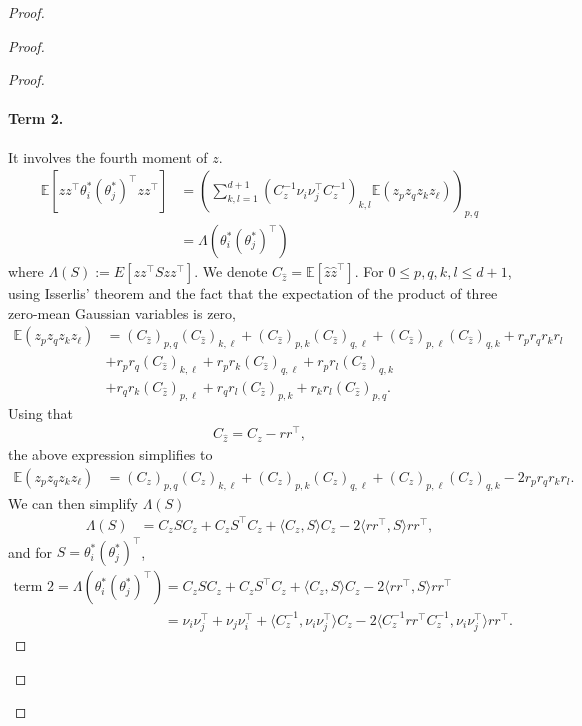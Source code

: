 \documentclass[11pt]{article}
\newcommand{\dotp}[2]{\langle #1, #2 \rangle}
\newcommand{\EE}{\mathbb{E}}
\begin{document}
\begin{proof}
\begin{proof}
\begin{proof}
\paragraph{Term 2.} It involves the fourth moment of $z$. 
\begin{align*}
   \EE[z z^\top \theta_i^*(\theta_j^*)^\top z z^\top] 
    &= \left( \sum_{k,l = 1}^{d+1} (C_z^{-1} \nu_i \nu_j^\top C_z^{-1})_{k,l}  \mathbb{E}(z_p z_q z_k z_{\ell}) \right)_{p,q} \\ &= \Lambda(\theta_i^*(\theta_j^*)^\top)
\end{align*}
where $\Lambda(S) := E[z z^\top S z z^\top] $. We denote $C_{\hat z} = \EE[\hat z \hat z^\top]$. For  $0 \leq p,q,k,l \leq d+1$, using Isserlis' theorem and the fact that the expectation of the product of three zero-mean Gaussian variables is zero,
\begin{align*}
 \mathbb{E}(z_p z_q z_k z_{\ell}) &=  (C_{\hat z})_{p,q} (C_{\hat z})_{k,\ell} + (C_{\hat z})_{p,k} (C_{\hat z})_{q,\ell} + (C_{\hat z})_{p,\ell} (C_{\hat z})_{q,k} + r_p r_q r_k r_l \\
 &+ r_p r_q (C_{\hat z})_{k,\ell} + r_p r_k (C_{\hat z})_{q,\ell} + r_p r_l (C_{\hat z})_{q,k} \\
 &+  r_q r_k (C_{\hat z})_{p,\ell} + r_q r_l (C_{\hat z})_{p,k} + r_k r_l (C_{\hat z})_{p,q} .
\end{align*}
Using that 
\begin{align*}
C_{\hat z} = C_z - rr^\top,
\end{align*}
the above expression simplifies to 
\begin{align*}
 \mathbb{E}(z_p z_q z_k z_{\ell}) &=  (C_{ z})_{p,q} (C_{ z})_{k,\ell} + (C_{ z})_{p,k} (C_{z})_{q,\ell} + (C_{z})_{p,\ell} (C_{z})_{q,k} - 2 r_p r_q r_k r_l.
\end{align*}
We can then  simplify $\Lambda(S)$
\begin{align*} 
	\Lambda(S) &= C_{z} S C_{z} + C_{z} S^\top C_{z} +  \dotp{C_{z}}{S} C_{z} - 2 \langle rr^\top, S \rangle  r r^\top  ,
\end{align*}
and for $S = \theta_i^*(\theta_j^*)^\top$, 
\begin{align} 
	\text{term 2} = \Lambda(\theta_i^*(\theta_j^*)^\top) &= C_z S C_z + C_z S^\top C_z + \dotp{C_z}{S} C_z - 2 \langle rr^\top, S \rangle  r r^\top \\
	&= \nu_i \nu_j^\top + \nu_j \nu_i^\top + \langle C_z^{-1}, \nu_i \nu_j^\top \rangle C_z - 2 \langle C_z^{-1} rr^\top C_z^{-1},   \nu_i \nu_j^\top  \rangle  r r^\top \label{eq:Lambda} .
\end{align}

\end{proof}
\end{proof}
\end{proof}
\end{document}
